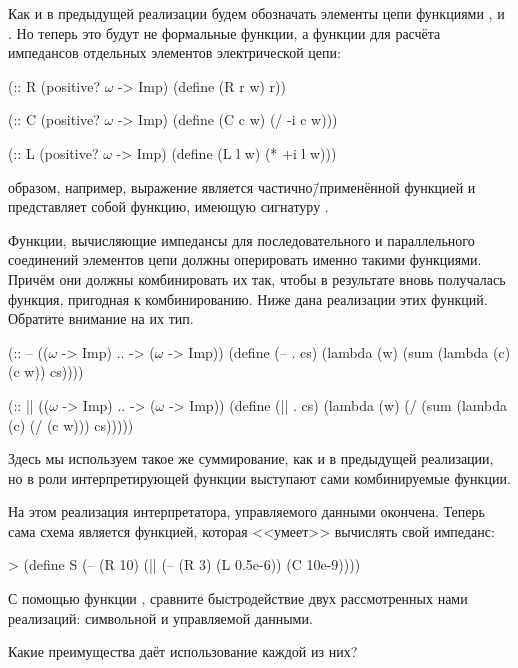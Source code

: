 Как и в предыдущей реализации будем обозначать элементы цепи функциями ,  и . Но теперь это будут не формальные функции, а функции для расчёта импедансов отдельных элементов электрической цепи:
\begin{Definition}[emph={r,c,l,w}]
(:: R (positive? $\omega$ -> Imp)
  (define (R r w) r))

(:: C (positive? $\omega$ -> Imp)
  (define (C c w) (/ -i c w)))

(:: L (positive? $\omega$ -> Imp)
  (define (L l w) (* +i l w)))
\end{Definition}
 образом, например, выражение  является частично\=/применённой функцией  и представляет собой функцию, имеющую сигнатуру .

Функции, вычисляющие импедансы для последовательного и параллельного соединений элементов цепи должны оперировать именно такими функциями. Причём они должны комбинировать их так, чтобы в результате вновь получалась функция, пригодная к комбинированию. Ниже дана реализации этих функций. Обратите внимание на их тип.
\begin{Definition}[emph={cs,c,w}]
(:: -- (($\omega$ -> Imp) .. -> ($\omega$ -> Imp))
  (define (-- . cs) 
    (lambda (w) (sum (lambda (c) (c w)) cs))))

(:: || (($\omega$ -> Imp) .. -> ($\omega$ -> Imp))
  (define (|| . cs) 
    (lambda (w) (/ (sum (lambda (c) (/ (c w))) cs)))))
\end{Definition}
Здесь мы используем такое же суммирование, как и в предыдущей реализации, но в роли интерпретирующей функции  выступают сами комбинируемые функции.

На этом реализация интерпретатора, управляемого данными окончена. Теперь сама схема является функцией, которая <<умеет>> вычислять свой импеданс:

\begin{SchemeCode}
> (define S
    (-- (R 10)
        (|| (-- (R 3)
                (L 0.5e-6))
            (C 10e-9))))
\end{SchemeCode}

\begin{Assignment}
 С помощью функции , сравните быстродействие двух рассмотренных нами реализаций: символьной и управляемой данными.

 Какие преимущества даёт использование каждой из них?
\end{Assignment}

